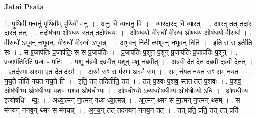 \documentclass[17pt]{extarticle}
\begin{document}
\textbf{Jatai Paata} \newline

1. पृ॒थि॒वी मन्वनु॑ पृथि॒वीम् पृ॑थि॒वी मनु॑ । . अनु॒ वि व्यन्वनु॒ वि । . व्या॑रदार॒द् वि व्या॑रत् । . आ॒र॒त् तत् तदा॑र दार॒त् तत् । . तदोष॑धय॒ ओष॑धय॒ स्तत् तदोष॑धयः । . ओष॑धयो वी॒रुधो॑ वी॒रुध॒ ओष॑धय॒ ओष॑धयो वी॒रुधः॑ । . वी॒रुधो॑ ऽभूवन् नभूवन्. वी॒रुधो॑ वी॒रुधो॑ ऽभूवन्न् । . अ॒भू॒व॒न् निती त्य॑भूवन् नभूव॒न् निति॑ । . इति॒ स स इतीति॒ सः । . स प्र॒जाप॑तिः प्र॒जाप॑तिः॒ स स प्र॒जाप॑तिः । . प्र॒जाप॑तिः प॒शून् प॒शून् प्र॒जाप॑तिः प्र॒जाप॑तिः प॒शून् । . प्र॒जाप॑ति॒रिति॑ प्र॒जा - प॒तिः॒ । . प॒शू न॑ब्रवी दब्रवीत् प॒शून् प॒शू न॑ब्रवीत् । . अ॒ब्र॒वी॒ दे॒त दे॒त द॑ब्रवी दब्रवी दे॒तत् । . ए॒तद॑स्मा अस्मा ए॒त दे॒त द॑स्मै । . अ॒स्मै॒ सꣳ स म॑स्मा अस्मै॒ सम् । . सम् न॑यत नयत॒ सꣳ सम् न॑यत । . न॒य॒ते तीति॑ नयत नय॒ते ति॑ । . इति॒ तत् तदितीति॒ तत् । . तत् प॒शवः॑ प॒शव॒ स्तत् तत् प॒शवः॑ । . प॒शव॒ ओष॑धीभ्य॒ ओष॑धीभ्यः प॒शवः॑ प॒शव॒ ओष॑धीभ्यः । . ओष॑धी॒भ्यो ऽध्यध्योष॑धीभ्य॒ ओष॑धी॒भ्यो ऽधि॑ । . ओष॑धीभ्य॒ इत्योष॑धि - भ्यः॒ । . अध्या॒त्मन् ना॒त्मन् नध्य ध्या॒त्मन्न् । . आ॒त्मन् थ्सꣳ स मा॒त्मन् ना॒त्मन् थ्सम् । . स म॑नयन् ननय॒न् थ्सꣳ स म॑नयन्न् । . अ॒न॒य॒न् तत् तद॑नयन् ननय॒न् तत् । . तत् प्रति॒ प्रति॒ तत् तत् प्रति॑ । \newline
\end{document}
